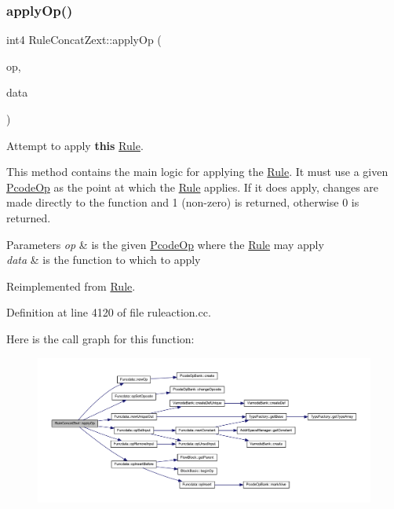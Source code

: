 \subsubsection{\texorpdfstring{applyOp()}{applyOp()}}
{\footnotesize\ttfamily int4 Rule\+Concat\+Zext\+::apply\+Op (\begin{DoxyParamCaption}\item[{\mbox{\hyperlink{class_pcode_op}{Pcode\+Op}} $\ast$}]{op,  }\item[{\mbox{\hyperlink{class_funcdata}{Funcdata}} \&}]{data }\end{DoxyParamCaption})\hspace{0.3cm}{\ttfamily [virtual]}}



Attempt to apply {\bfseries{this}} \mbox{\hyperlink{class_rule}{Rule}}. 

This method contains the main logic for applying the \mbox{\hyperlink{class_rule}{Rule}}. It must use a given \mbox{\hyperlink{class_pcode_op}{Pcode\+Op}} as the point at which the \mbox{\hyperlink{class_rule}{Rule}} applies. If it does apply, changes are made directly to the function and 1 (non-\/zero) is returned, otherwise 0 is returned. 
\begin{DoxyParams}{Parameters}
{\em op} & is the given \mbox{\hyperlink{class_pcode_op}{Pcode\+Op}} where the \mbox{\hyperlink{class_rule}{Rule}} may apply \\
\hline
{\em data} & is the function to which to apply \\
\hline
\end{DoxyParams}


Reimplemented from \mbox{\hyperlink{class_rule_a4e3e61f066670175009f60fb9dc60848}{Rule}}.



Definition at line 4120 of file ruleaction.\+cc.

Here is the call graph for this function\+:
\nopagebreak
\begin{figure}[H]
\begin{center}
\leavevmode
\includegraphics[width=350pt]{class_rule_concat_zext_aa7e8b70ac971efc988253c8b42e080b7_cgraph}
\end{center}
\end{figure}
\mbox{\label{class_rule_concat_zext_a0226be4927a0d964699fb17ba49804af}} 
